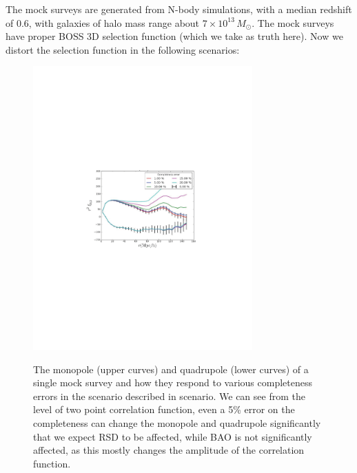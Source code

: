  The mock surveys are generated from N-body simulations, with a median redshift
 of 0.6, with galaxies of halo mass range about $7\times10^{13}\,M_\odot$. The mock
 surveys have proper BOSS 3D selection function (which we take as truth here).
 Now we distort the selection function in the following scenarios:


\begin{figure}
 \includegraphics[width =0.75\textwidth]{Plots/GRS_req_1July2016_v3_P6fig.pdf}
 \label{fig:selection_function}
 \caption{The monopole (upper curves) and quadrupole (lower curves) of a single mock survey and how they respond to various completeness errors in the scenario described in scenario. We can see from the level of two point correlation function, even a 5\% error on the completeness can change the monopole   and quadrupole significantly that we expect RSD to be affected, while BAO is not significantly affected, as this mostly changes the amplitude of the correlation function.}
  \end{figure}

